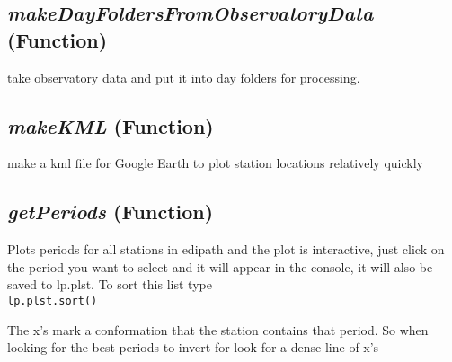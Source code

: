 \subsection{\textit{makeDayFoldersFromObservatoryData} (Function)}
\label{ssec:core.mttools.makeDayFoldersFromObservatoryData}

take observatory data and put it
    into day folders for processing.

\subsection{\textit{makeKML} (Function)}
\label{ssec:core.mttools.makeKML}

make a kml file for Google Earth to plot station locations 
    relatively quickly

\subsection{\textit{getPeriods} (Function)}
\label{ssec:core.mttools.getPeriods}

Plots periods for all stations in edipath and the plot is interactive, just
    click on the period you want to select and it will appear in the console,
    it will also be saved to lp.plst.  To sort this list type\\ \texttt{lp.plst.sort()}
    
    The x's mark a conformation that the station contains that period.  So 
    when looking for the best periods to invert for look for a dense line of 
    x's
